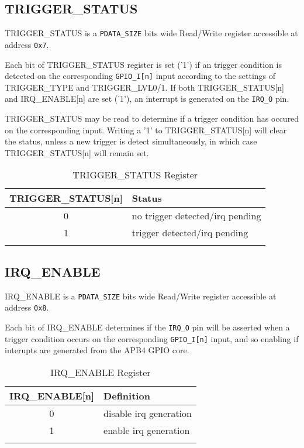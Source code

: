 \subsection{TRIGGER\_STATUS}\label{triggerstatus}

TRIGGER\_STATUS is a \texttt{PDATA\_SIZE} bits wide Read/Write register accessible at address \texttt{0x7}.

Each bit of TRIGGER\_STATUS register is set ('1') if an trigger condition is detected on the corresponding \texttt{GPIO\_I[n]} input according to the settings of TRIGGER\_TYPE and TRIGGER\_LVL0/1. If both TRIGGER\_STATUS[n] and IRQ\_ENABLE[n] are set ('1'), an interrupt is generated on the \texttt{IRQ\_O} pin.

TRIGGER\_STATUS may be read to determine if a trigger condition has occured on the corresponding input. Writing a '1' to TRIGGER\_STATUS[n] will clear the status, unless a new trigger is detect simultaneously, in which case TRIGGER\_STATUS[n] will remain set.

\begin{longtable}[]{@{}cl@{}}
\toprule
\textbf{TRIGGER\_STATUS[n]} & \textbf{Status}\tabularnewline
\midrule
\endhead
0 & no trigger detected/irq pending\tabularnewline
1 & trigger detected/irq pending\tabularnewline
\bottomrule
\caption{TRIGGER\_STATUS Register}
\end{longtable}

\subsection{IRQ\_ENABLE}\label{irqenable}

IRQ\_ENABLE is a \texttt{PDATA\_SIZE} bits wide Read/Write register accessible at address \texttt{0x8}.

Each bit of IRQ\_ENABLE determines if the \texttt{IRQ\_O} pin will be asserted when a trigger condition occurs on the corresponding \texttt{GPIO\_I[n]} input, and so enabling if interupts are generated from the APB4 GPIO core.

\begin{longtable}[]{@{}cl@{}}
\toprule
\textbf{IRQ\_ENABLE[n]} & \textbf{Definition}\tabularnewline
\midrule
\endhead
0 & disable irq generation\tabularnewline
1 & enable irq generation\tabularnewline
\bottomrule
\caption{IRQ\_ENABLE Register}
\end{longtable}
